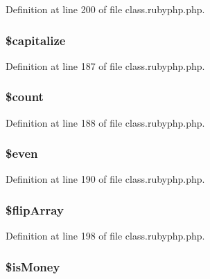 Definition at line 200 of file class.\-rubyphp.\-php.

\hypertarget{classr_a41c83fecb936997f3e2dae40207e31dd}{
\subsubsection[{\$capitalize}]{\setlength{\rightskip}{0pt plus 5cm}\$capitalize}}\label{classr_a41c83fecb936997f3e2dae40207e31dd}


Definition at line 187 of file class.\-rubyphp.\-php.

\hypertarget{classr_af789423037bbc89dc7c850e761177570}{
\subsubsection[{\$count}]{\setlength{\rightskip}{0pt plus 5cm}\$count}}\label{classr_af789423037bbc89dc7c850e761177570}


Definition at line 188 of file class.\-rubyphp.\-php.

\hypertarget{classr_ab661cd196618c18d23108b83a10728f3}{
\subsubsection[{\$even}]{\setlength{\rightskip}{0pt plus 5cm}\${\bf even}}}\label{classr_ab661cd196618c18d23108b83a10728f3}


Definition at line 190 of file class.\-rubyphp.\-php.

\hypertarget{classr_a530c822a487ad325618509d8bf48553a}{
\subsubsection[{\$flip\-Array}]{\setlength{\rightskip}{0pt plus 5cm}\$flip\-Array}}\label{classr_a530c822a487ad325618509d8bf48553a}


Definition at line 198 of file class.\-rubyphp.\-php.

\hypertarget{classr_aa2f5c87cc7b1ab41965e940d5c1406d9}{
\subsubsection[{\$is\-Money}]{\setlength{\rightskip}{0pt plus 5cm}\$is\-Money}}\label{classr_aa2f5c87cc7b1ab41965e940d5c1406d9}


